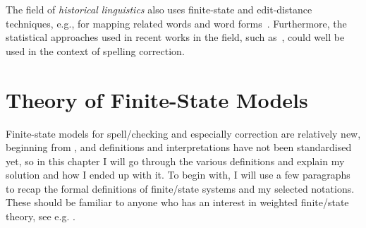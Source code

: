\documentclass[officiallayout,final]{unihelcompling}
\begin{document}
The field of \emph{historical linguistics} also uses finite-state and
edit-distance techniques, e.g., for mapping related words and
word forms~\citep{porta2013edit}. Furthermore, the statistical approaches used
in recent works in the field, such as~\citet{petterson2013smt}, could well be
used in the context of spelling correction. 

\section{Theory of Finite-State Models}
\label{sec:finite-state-theory}

Finite-state models for spell\-/checking and especially correction are relatively
new, beginning from \citep{oflazer1996errortolerant}, and
definitions and interpretations have not been standardised yet, so in this
chapter I will go through the various definitions and explain my
solution and how I ended up with it. To begin with, I will use a few paragraphs
to recap the formal definitions of finite\-/state systems and my selected
notations. These should be familiar to anyone who has an interest in weighted
finite\-/state theory, see e.g. \citet{aho2007compilers,mohri1997finitestate}.
\end{document}
